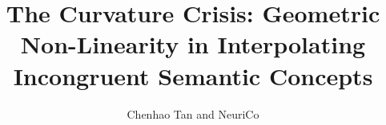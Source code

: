 \documentclass{article}
\title{The Curvature Crisis: Geometric Non-Linearity in Interpolating Incongruent Semantic Concepts}
\author{Chenhao Tan and NeuriCo}
\begin{document}
\maketitle

\begin{abstract}

\end{abstract}









\end{document}
